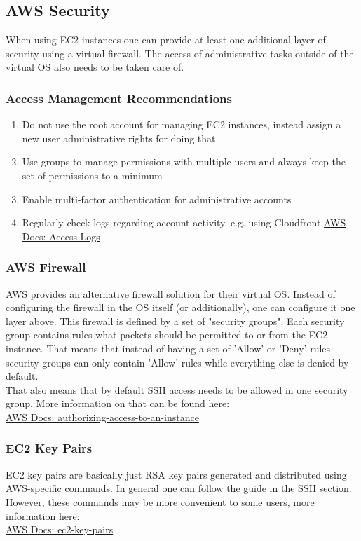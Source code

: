 \subsection{AWS Security}
When using EC2 instances one can provide at least one additional layer of security using a virtual firewall. The access of administrative tasks outside of the virtual OS also needs to be taken care of.

\subsubsection{Access Management Recommendations}
\begin{enumerate}
    \item Do not use the root account for managing EC2 instances, instead assign a new user administrative rights for doing that.
    \item Use groups to manage permissions with multiple users and always keep the set of permissions to a minimum
    \item Enable multi-factor authentication for administrative accounts
    \item Regularly check logs regarding account activity, e.g. using Cloudfront \href{https://docs.aws.amazon.com/AmazonCloudFront/latest/DeveloperGuide/AccessLogs.html}{AWS Docs: Access Logs}
\end{enumerate}

\subsubsection{AWS Firewall}

AWS provides an alternative firewall solution for their virtual OS. Instead of configuring the firewall in the OS itself (or additionally), one can configure it one layer above. This firewall is defined by a set of "security groups". Each security group contains rules what packets should be permitted to or from the EC2 instance. That means that instead of having a set of 'Allow' or 'Deny' rules security groups can only contain 'Allow' rules while everything else is denied by default. \\

That also means that by default SSH access needs to be allowed in one security group. More information on that can be found here: \\ 
\href{https://docs.aws.amazon.com/AWSEC2/latest/UserGuide/authorizing-access-to-an-instance.html}{AWS Docs: authorizing-access-to-an-instance}

\subsubsection{EC2 Key Pairs}
EC2 key pairs are basically just RSA key pairs generated and distributed using AWS-specific commands. In general one can follow the guide in the SSH section. However, these commands may be more convenient to some users, more information here: \\
\href{https://docs.aws.amazon.com/AWSEC2/latest/UserGuide/ec2-key-pairs.html}{AWS Docs: ec2-key-pairs}

